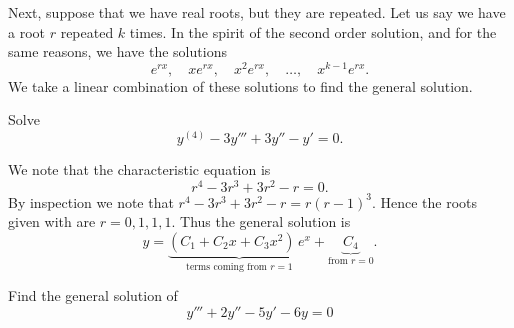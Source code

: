 \documentclass{ximera}
\begin{document}

Next, suppose that we have real roots, but they are repeated.  Let us say we have a root $r$ repeated $k$ times.  In the spirit of the second order solution, and for the same reasons, we have the solutions
\begin{equation*}
    e^{rx}, \quad xe^{rx}, \quad x^2 e^{rx}, \quad \ldots, \quad x^{k-1} e^{rx} .
\end{equation*}
We take a linear combination of these solutions to find the general solution.

\begin{example}
    Solve
    \begin{equation*}
        y^{(4)} - 3 y''' + 3 y'' - y' =  0 .
    \end{equation*}
\end{example}

\begin{exampleSol}
    We note that the characteristic equation is
    \begin{equation*}
        r^4 - 3r^3 + 3r^2 -r = 0 .
    \end{equation*}
    By inspection we note that $r^4 - 3r^3 + 3r^2 -r = r{(r-1)}^3$.  Hence the roots given with  are $r = 0, 1, 1, 1$.  Thus the general solution is
    \begin{equation*}
        y = \underbrace{(C_1 + C_2 x + C_3 x^2)\, e^x}_{\text{terms coming from } r=1} + \underbrace{C_4}_{\text{from } r=0} .
    \end{equation*}
\end{exampleSol}

\begin{example} \label{ex:factorguess}
    Find the general solution of 
    \begin{equation*}
        y''' + 2y'' - 5y' - 6y = 0
    \end{equation*}
\end{example}
\end{document}
